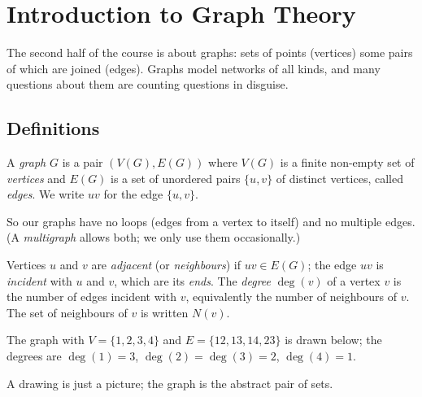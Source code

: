 \chapter{Introduction to Graph Theory}


The second half of the course is about graphs: sets of points (vertices) some pairs of which
are joined (edges). Graphs model networks of all kinds, and many questions about them are
counting questions in disguise.

\section{Definitions}

\begin{definition}[Graph]
A \emph{graph} $G$ is a pair $(V(G), E(G))$ where $V(G)$ is a finite non-empty set of
\emph{vertices} and $E(G)$ is a set of unordered pairs $\{u,v\}$ of distinct vertices, called
\emph{edges}. We write $uv$ for the edge $\{u,v\}$.
\end{definition}

So our graphs have no loops (edges from a vertex to itself) and no multiple edges. (A
\emph{multigraph} allows both; we only use them occasionally.)

\begin{definition}
Vertices $u$ and $v$ are \emph{adjacent} (or \emph{neighbours}) if $uv \in E(G)$; the edge $uv$
is \emph{incident} with $u$ and $v$, which are its \emph{ends}. The \emph{degree} $\deg(v)$ of a
vertex $v$ is the number of edges incident with $v$, equivalently the number of neighbours of $v$.
The set of neighbours of $v$ is written $N(v)$.
\end{definition}

\begin{example}
The graph with $V = \{1,2,3,4\}$ and $E = \{12, 13, 14, 23\}$ is drawn below; the degrees are
$\deg(1) = 3$, $\deg(2) = \deg(3) = 2$, $\deg(4) = 1$.
\begin{center}
\end{center}
A drawing is just a picture; the graph is the abstract pair of sets.
\end{example}

